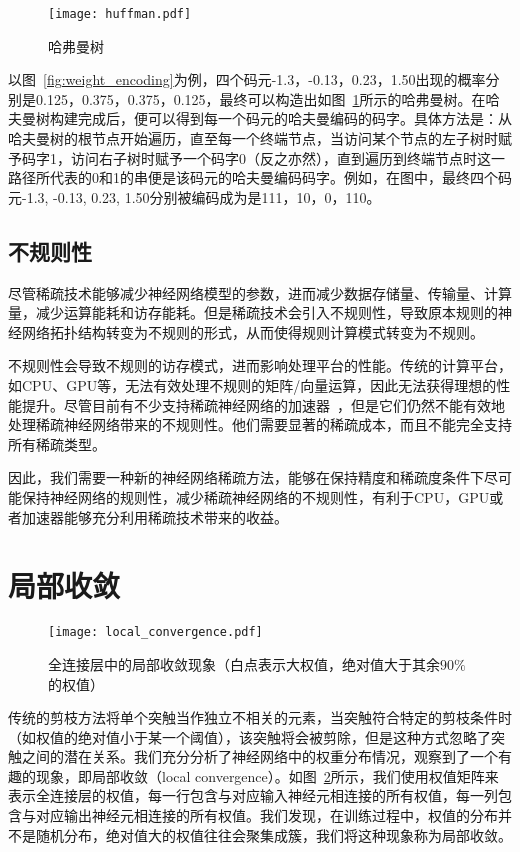 \begin{figure}[h]
\centering
\texttt{[image: huffman.pdf]}
\caption{哈弗曼树}
\label{fig:huffman}
\end{figure}
以图~\ref{fig:weight_encoding}为例，四个码元-1.3，-0.13，0.23，1.50出现的概率分别是0.125，0.375，0.375，0.125，最终可以构造出如图~\ref{fig:huffman}所示的哈弗曼树。在哈夫曼树构建完成后，便可以得到每一个码元的哈夫曼编码的码字。具体方法是：从哈夫曼树的根节点开始遍历，直至每一个终端节点，当访问某个节点的左子树时赋予码字1，访问右子树时赋予一个码字0（反之亦然），直到遍历到终端节点时这一路径所代表的0和1的串便是该码元的哈夫曼编码码字。例如，在图中，最终四个码元-1.3, -0.13, 0.23, 1.50分别被编码成为是111，10，0，110。

\subsection{不规则性}
尽管稀疏技术能够减少神经网络模型的参数，进而减少数据存储量、传输量、计算量，减少运算能耗和访存能耗。但是稀疏技术会引入不规则性，导致原本规则的神经网络拓扑结构转变为不规则的形式，从而使得规则计算模式转变为不规则。

不规则性会导致不规则的访存模式，进而影响处理平台的性能。传统的计算平台，如CPU、GPU等，无法有效处理不规则的矩阵/向量运算，因此无法获得理想的性能提升。尽管目前有不少支持稀疏神经网络的加速器~\cite{zhang2016cambricon, albericio2016cnvlutin, han2016eie, han2017ese, angshuman2017scnn}，但是它们仍然不能有效地处理稀疏神经网络带来的不规则性。他们需要显著的稀疏成本，而且不能完全支持所有稀疏类型。

因此，我们需要一种新的神经网络稀疏方法，能够在保持精度和稀疏度条件下尽可能保持神经网络的规则性，减少稀疏神经网络的不规则性，有利于CPU，GPU或者加速器能够充分利用稀疏技术带来的收益。


\section{局部收敛}

\begin{figure}[h]
  \centering
  \texttt{[image: local\_convergence.pdf]}
  \caption{全连接层中的局部收敛现象（白点表示大权值，绝对值大于其余$90\%$的权值）}
  \label{fig:local_convergence}
\end{figure}

传统的剪枝方法将单个突触当作独立不相关的元素，当突触符合特定的剪枝条件时（如权值的绝对值小于某一个阈值），该突触将会被剪除，但是这种方式忽略了突触之间的潜在关系。我们充分分析了神经网络中的权重分布情况，观察到了一个有趣的现象，即局部收敛（local convergence）。如图~\ref{fig:local_convergence}所示，我们使用权值矩阵来表示全连接层的权值，每一行包含与对应输入神经元相连接的所有权值，每一列包含与对应输出神经元相连接的所有权值。我们发现，在训练过程中，权值的分布并不是随机分布，绝对值大的权值往往会聚集成簇，我们将这种现象称为局部收敛。

